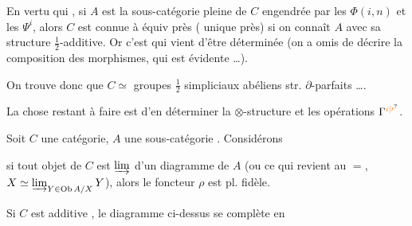 
En vertu  qui , si $A$ est la sous-catégorie pleine de $C$ engendrée par les $\Phi(i,n)$ et les $\Psi^i$, alors $C$ est connue à équiv près ( unique près) si on connaît $A$ avec sa structure $\frac12$-additive. Or c'est  qui vient d'être déterminée (on a omis de décrire la composition des morphismes, qui est évidente \ldots).

On trouve donc que $C\simeq$ groupes $\frac12$ simpliciaux abéliens str. $\partial$-parfaits \ldots.

La chose restant à faire est d'en déterminer la $\otimes$-structure et les opérations $\Gamma^{\unsure{i|\prime}}$.


Soit $C$ une catégorie, $A$ une sous-catégorie  . Considérons 


si  tout objet  de $C$ est $\varinjlim$  d'un diagramme de $A$ (ou ce qui revient au $=$, $X\simeq\varinjlim_{Y\in\mathrm{Ob}\,A/X}Y$), alors le foncteur $\rho$ est pl. fidèle.

Si $C$ est additive , le diagramme ci-dessus se complète en



